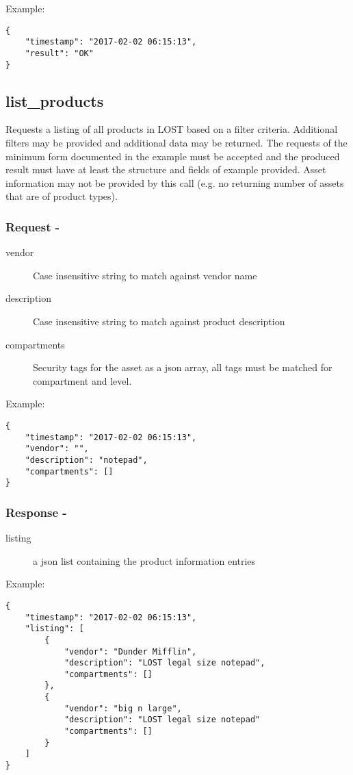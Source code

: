 \noindent Example:
\begin{verbatim}
{
    "timestamp": "2017-02-02 06:15:13",
    "result": "OK"
}
\end{verbatim}


\subsection*{list\_products}
Requests a listing of all products in LOST based on a filter criteria. Additional filters may be provided and additional data may be returned. The requests of the minimum form documented in the example must be accepted and the produced result must have at least the structure and fields of example provided. Asset information may not be provided by this call (e.g. no returning number of assets that are of product types).
\\

\subsubsection*{Request -}
\begin{description}
\item[vendor] Case insensitive string to match against vendor name
\item[description] Case insensitive string to match against product description
\item[compartments] Security tags for the asset as a json array, all tags must be matched for compartment and level.
\end{description}

\noindent Example:
\begin{verbatim}
{
    "timestamp": "2017-02-02 06:15:13",
    "vendor": "",
    "description": "notepad",
    "compartments": []
}
\end{verbatim}

\subsubsection*{Response -}
\begin{description}
\item[listing] a json list containing the product information entries
\end{description}

\noindent Example:
\begin{verbatim}
{
    "timestamp": "2017-02-02 06:15:13",
    "listing": [
        {
            "vendor": "Dunder Mifflin",
            "description": "LOST legal size notepad",
            "compartments": []
        },
        {
            "vendor": "big n large",
            "description": "LOST legal size notepad"
            "compartments": []
        }
    ]
}
\end{verbatim}

